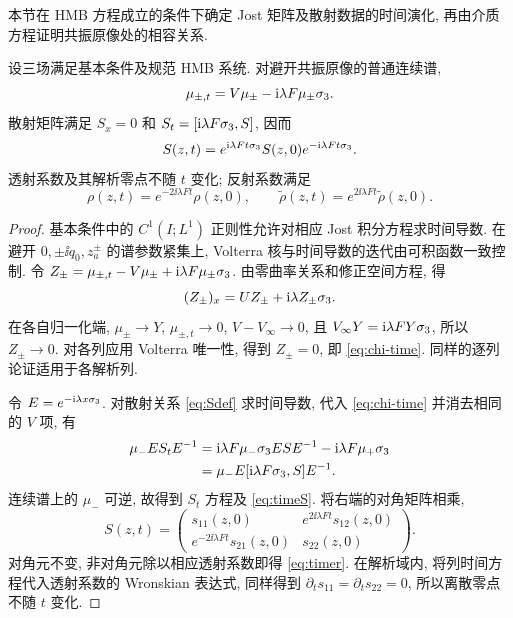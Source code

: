 本节在 HMB 方程成立的条件下确定 Jost 矩阵及散射数据的时间演化,
再由介质方程证明共振原像处的相容关系.

\begin{proposition}\label{prop:evolution}
设三场满足基本条件及规范 HMB 系统. 对避开共振原像的普通连续谱,
\begin{equation}\label{eq:chi-time}
\mu_{\pm,t}=V\mu_\pm-\mathrm{i}\lambda F\mu_\pm\sigma_3.
\end{equation}
散射矩阵满足 $S_x=0$ 和 $S_t=[\mathrm{i}\lambda F\sigma_3,S]$, 因而
\begin{equation}\label{eq:timeS}
S(z,t)=e^{\mathrm{i}\lambda Ft\sigma_3}S(z,0)e^{-\mathrm{i}\lambda Ft\sigma_3}.
\end{equation}
透射系数及其解析零点不随 $t$ 变化; 反射系数满足
\begin{equation}\label{eq:timer}
\rho(z,t)=e^{-2\ii\lambda Ft}\rho(z,0),\qquad
\widetilde\rho(z,t)=e^{2\ii\lambda Ft}\widetilde\rho(z,0).
\end{equation}
\end{proposition}
\begin{proof}
基本条件中的 $C^1(I;L^1)$ 正则性允许对相应 Jost 积分方程求时间导数.
在避开 $0,\pm\ii q_0,z_a^\pm$ 的谱参数紧集上, Volterra 核与时间导数的迭代由可积函数一致控制.
令 $Z_\pm=\mu_{\pm,t}-V\mu_\pm+\mathrm{i}\lambda F\mu_\pm\sigma_3$.
由零曲率关系和修正空间方程, 得
\begin{equation*}
(Z_\pm)_x=UZ_\pm+\mathrm{i}\lambda Z_\pm\sigma_3.
\end{equation*}
在各自归一化端, $\mu_\pm\to Y$, $\mu_{\pm,t}\to0$, $V-V_\infty\to0$,
且 $V_\infty Y=\mathrm{i}\lambda FY\sigma_3$, 所以 $Z_\pm\to0$.
对各列应用 Volterra 唯一性, 得到 $Z_\pm=0$, 即 \eqref{eq:chi-time}.
同样的逐列论证适用于各解析列.

令 $E=e^{-\mathrm{i}\lambda x\sigma_3}$. 对散射关系 \eqref{eq:Sdef} 求时间导数, 代入 \eqref{eq:chi-time} 并消去相同的 $V$ 项, 有
\begin{equation*}
\begin{aligned}
\mu_-ES_tE^{-1}
&=\mathrm{i}\lambda F\mu_-\sigma_3 ESE^{-1}-\mathrm{i}\lambda F\mu_+\sigma_3\\
&=\mu_-E[\mathrm{i}\lambda F\sigma_3,S]E^{-1}.
\end{aligned}
\end{equation*}
连续谱上的 $\mu_-$ 可逆, 故得到 $S_t$ 方程及 \eqref{eq:timeS}.
将右端的对角矩阵相乘,
\begin{equation*}
S(z,t)=
\begin{pmatrix}
s_{11}(z,0)&e^{2\ii\lambda Ft}s_{12}(z,0)\\
e^{-2\ii\lambda Ft}s_{21}(z,0)&s_{22}(z,0)
\end{pmatrix}.
\end{equation*}
对角元不变, 非对角元除以相应透射系数即得 \eqref{eq:timer}.
在解析域内, 将列时间方程代入透射系数的 Wronskian 表达式, 同样得到
$\partial_t s_{11}=\partial_t s_{22}=0$, 所以离散零点不随 $t$ 变化.
\end{proof}

